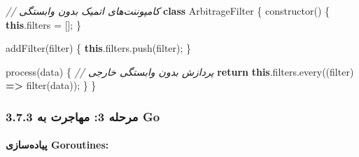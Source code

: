\documentclass[
]{article}
\newenvironment{Shaded}{}{}
\newcommand{\AttributeTok}[1]{\textcolor[rgb]{0.49,0.56,0.16}{#1}}
\newcommand{\BuiltInTok}[1]{\textcolor[rgb]{0.00,0.50,0.00}{#1}}
\newcommand{\CommentTok}[1]{\textcolor[rgb]{0.38,0.63,0.69}{\textit{#1}}}
\newcommand{\ControlFlowTok}[1]{\textcolor[rgb]{0.00,0.44,0.13}{\textbf{#1}}}
\newcommand{\FunctionTok}[1]{\textcolor[rgb]{0.02,0.16,0.49}{#1}}
\newcommand{\KeywordTok}[1]{\textcolor[rgb]{0.00,0.44,0.13}{\textbf{#1}}}
\newcommand{\NormalTok}[1]{#1}
\newcommand{\OperatorTok}[1]{\textcolor[rgb]{0.40,0.40,0.40}{#1}}
\begin{document}
\begin{Shaded}
\begin{Highlighting}[]
\CommentTok{// کامپوننت‌های اتمیک بدون وابستگی}
\KeywordTok{class}\NormalTok{ ArbitrageFilter \{}
  \FunctionTok{constructor}\NormalTok{() \{}
    \KeywordTok{this}\OperatorTok{.}\AttributeTok{filters} \OperatorTok{=}\NormalTok{ []}\OperatorTok{;}
\NormalTok{  \}}

  \FunctionTok{addFilter}\NormalTok{(filter) \{}
    \KeywordTok{this}\OperatorTok{.}\AttributeTok{filters}\OperatorTok{.}\FunctionTok{push}\NormalTok{(filter)}\OperatorTok{;}
\NormalTok{  \}}

  \BuiltInTok{process}\NormalTok{(data) \{}
    \CommentTok{// پردازش بدون وابستگی خارجی}
    \ControlFlowTok{return} \KeywordTok{this}\OperatorTok{.}\AttributeTok{filters}\OperatorTok{.}\FunctionTok{every}\NormalTok{((filter) }\KeywordTok{=\textgreater{}} \FunctionTok{filter}\NormalTok{(data))}\OperatorTok{;}
\NormalTok{  \}}
\NormalTok{\}}
\end{Highlighting}
\end{Shaded}

\subsubsection{3.7.3 مرحله 3: مهاجرت به
Go}\label{ux645ux631ux62dux644ux647-3-ux645ux647ux627ux62cux631ux62a-ux628ux647-go}

\paragraph{پیاده‌سازی
Goroutines:}\label{ux67eux6ccux627ux62fux647ux633ux627ux632ux6cc-goroutines}
\end{document}
